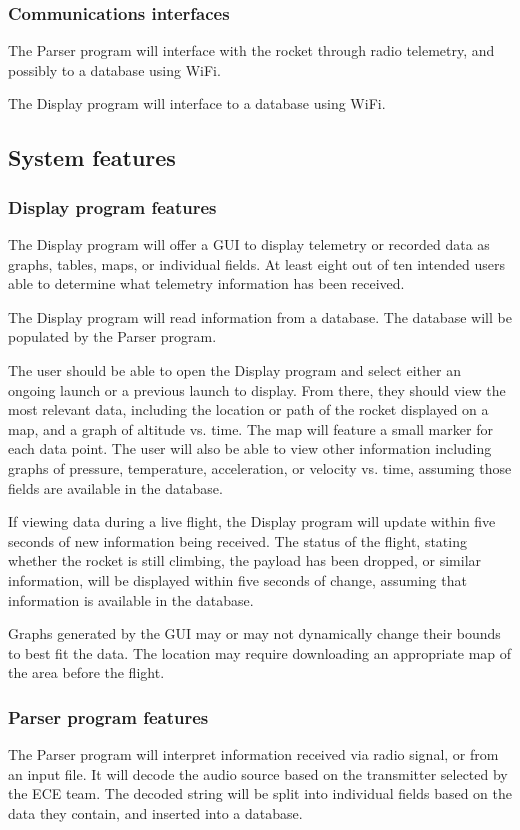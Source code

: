 \documentclass[onecolumn, draftclsnofoot, 10pt, compsoc]{IEEEtran}
\begin{document}
\subsubsection{Communications interfaces}
The Parser program will interface with the rocket through radio telemetry, and possibly to a database using WiFi.

The Display program will interface to a database using WiFi.

\subsection{System features}

\subsubsection{Display program features}
The Display program will offer a GUI to display telemetry or recorded data as graphs, tables, maps, or individual fields. At least eight out of ten intended users able to determine what telemetry information has been received.

The Display program will read information from a database.  The database will be populated by the Parser program.

The user should be able to open the Display program and select either an ongoing launch or a previous launch to display. From there, they should view the most relevant data, including the location or path of the rocket displayed on a map, and a graph of altitude vs. time. The map will feature a small marker for each data point. The user will also be able to view other information including graphs of pressure, temperature, acceleration, or velocity vs. time, assuming those fields are available in the database.

If viewing data during a live flight, the Display program will update within five seconds of new information being received.  The status of the flight, stating whether the rocket is still climbing, the payload has been dropped, or similar information, will be displayed within five seconds of change, assuming that information is available in the database.

Graphs generated by the GUI may or may not dynamically change their bounds to best fit the data.  The location may require downloading an appropriate map of the area before the flight.

\subsubsection{Parser program features}
The Parser program will interpret information received via radio signal, or from an input file. It will decode the audio source based on the transmitter selected by the ECE team.  The decoded string will be split into individual fields based on the data they contain, and inserted into a database.
\end{document}
